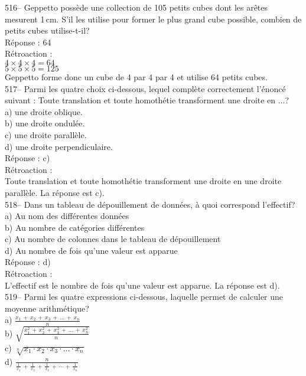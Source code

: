 ﻿\documentclass[letterpaper, 12pt]{article}
\begin{document}
516-- Geppetto poss\`ede une collection de 105 petits cubes dont les
ar\^etes mesurent 1\,cm.  S'il les utilise pour former le plus grand cube
possible, combien de petits cubes utilise-t-il?  \\

R\'eponse : 64\\

R\'etroaction :  \\
$4\times4\times4=64$\\
$5\times5\times5=125$\\
Geppetto forme donc un cube de 4 par 4 par 4 et utilise 64 petits cubes.  \\

517-- Parmi les quatre choix ci-dessous, lequel compl\`ete
correctement l'\'enonc\'e suivant : \og Toute translation et toute
homoth\'etie transforment une droite en $\ldots$\fg ?\\
a) une droite oblique.\\
b) une droite ondul\'ee.\\
c) une droite parall\`ele.\\
d) une droite perpendiculaire.\\

R\'eponse : c)\\

R\'etroaction : \\
Toute translation et toute homoth\'etie transforment une droite en une
droite parall\`ele.  La r\'eponse est c).\\


518-- Dans un tableau de d\'epouillement de donn\'ees, \`a quoi correspond
l'effectif?\\
a) Au nom des diff\'erentes donn\'ees\\
b) Au nombre de cat\'egories diff\'erentes\\
c) Au nombre de colonnes dans le tableau de d\'epouillement\\
d) Au nombre de fois qu'une valeur est apparue\\

R\'eponse : d)\\

R\'etroaction : \\
L'effectif est le nombre de fois qu'une valeur est apparue.  La r\'eponse
est d).\\

519-- Parmi les quatre expressions ci-dessous, laquelle permet de calculer
une moyenne arithm\'etique?\\
a) $\frac{x_1\,+\,x_2\,+\,x_3\,+\,\ldots\,+\,x_n}{n}$\\[2mm]
b)
$\sqrt{\frac{x_1^{2}\,+\,x_2^{2}\,+\,x_3^{2}\,+\,\ldots\,+\,x_n^{2}}{n}}$\\[2mm]
c) $\sqrt[n]{x_1 \cdot x_2 \cdot x_3 \cdot \ldots \cdot x_n}$\\[2mm]
d)
$\frac{n}{\frac{1}{x_1}\,+\,\frac{1}{x_2}\,+\,\frac{1}{x_3}\,+\,\cdots\,+\,\frac{1}{x_n}}$\\
\end{document}
